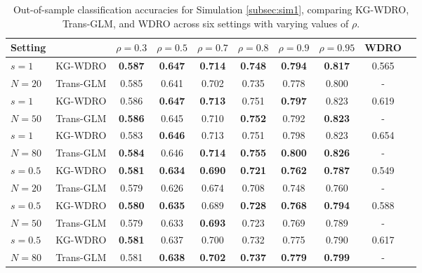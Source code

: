 \documentclass[12pt]{article}
\begin{document}
\begin{table}[H]
\begin{center}
\begin{small}
\setlength{\tabcolsep}{3pt} %
\renewcommand{\arraystretch}{1.1} %
\begin{sc}
\begin{tabular}{l|c|cccccc|cr}
\toprule
Setting & & $\rho = 0.3$ & $\rho = 0.5$ & $\rho = 0.7$ & $\rho = 0.8$ & $\rho = 0.9$ & $\rho = 0.95$ & WDRO\\
\midrule
$s = 1$ & KG-WDRO  & \textbf{0.587} & \textbf{0.647} & \textbf{0.714} & \textbf{0.748} & \textbf{0.794} & \textbf{0.817} & 0.565\\
$N=20$ & Trans-GLM & 0.585 & 0.641 & 0.702 & 0.735 & 0.778 & 0.800 & - \\
\midrule
$s = 1$ & KG-WDRO  & {0.586} & \textbf{0.647} & \textbf{0.713} & 0.751 & \textbf{0.797} & {0.823} & 0.619\\
$N=50$ & Trans-GLM & \textbf{0.586} & 0.645 & 0.710 & \textbf{0.752} & 0.792 & \textbf{0.823} & - \\
\midrule
$s = 1$ & KG-WDRO  & 0.583 & \textbf{0.646} & {0.713} & 0.751 & {0.798} & 0.823 & 0.654 \\
$N=80$ & Trans-GLM  & \textbf{0.584} & {0.646} & \textbf{0.714} & \textbf{0.755} & \textbf{0.800} & \textbf{0.826} & - \\
\midrule
$s = 0.5$ & KG-WDRO     & \textbf{0.581} & \textbf{0.634} & \textbf{0.690} & \textbf{0.721} & \textbf{0.762} & \textbf{0.787} & 0.549\\
$N=20$ & Trans-GLM   & 0.579 & 0.626 & 0.674 & 0.708 & 0.748 & 0.760 & -\\
\midrule
$s = 0.5$ & KG-WDRO     & \textbf{0.580} & \textbf{0.635} & 0.689 & \textbf{0.728} & \textbf{0.768} & \textbf{0.794} & 0.588\\
$N=50$ & Trans-GLM   & 0.579 & 0.633 & \textbf{0.693} & 0.723 & {0.769} & 0.789 & -\\
\midrule
$s = 0.5$ & KG-WDRO     & \textbf{0.581} & 0.637 & {0.700} & {0.732} & 0.775 & 0.790 & 0.617\\
$N=80$ & Trans-GLM   & 0.581 & \textbf{0.638} & \textbf{0.702} & \textbf{0.737} & \textbf{0.779} & \textbf{0.799} & -\\
\bottomrule
\end{tabular}
\end{sc}
\end{small}
\end{center}

\caption{Out-of-sample classification accuracies for Simulation \ref{subsec:sim1}, comparing KG-WDRO, Trans-GLM, and WDRO across six settings with varying values of $\rho$.}
\label{tab:sim1}
\end{table}
\end{document}
